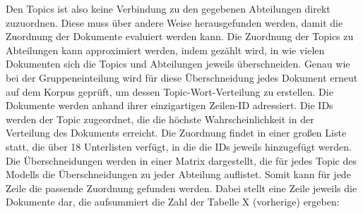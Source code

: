 \documentclass[german,version-2020-11]{uzl-thesis}
\begin{document}
\begin{enumerate}
Den Topics ist also keine Verbindung zu den gegebenen Abteilungen direkt zuzuordnen. Diese muss über andere Weise herausgefunden werden, damit die Zuordnung der Dokumente evaluiert werden kann. Die Zuordnung der Topics zu Abteilungen kann approximiert werden, indem gezählt wird, in wie vielen Dokumenten sich die Topics und Abteilungen jeweils überschneiden. Genau wie bei der Gruppeneinteilung wird für diese Überschneidung jedes Dokument erneut auf dem Korpus geprüft, um dessen Topic-Wort-Verteilung zu erstellen. Die Dokumente werden anhand ihrer einzigartigen Zeilen-ID adressiert. Die IDs werden der Topic zugeordnet, die die höchste Wahrscheinlichkeit in der Verteilung des Dokuments erreicht. Die Zuordnung findet in einer großen Liste statt, die über 18 Unterlisten verfügt, in die die IDs jeweils hinzugefügt werden. Die Überschneidungen werden in einer Matrix dargestellt, die für jedes Topic des Modells die Überschneidungen zu jeder Abteilung auflistet. Somit kann für jede Zeile die passende Zuordnung gefunden werden. Dabei stellt eine Zeile jeweils die Dokumente dar, die aufsummiert die Zahl der Tabelle X (vorherige) ergeben: 



\end{enumerate}
\end{document}
